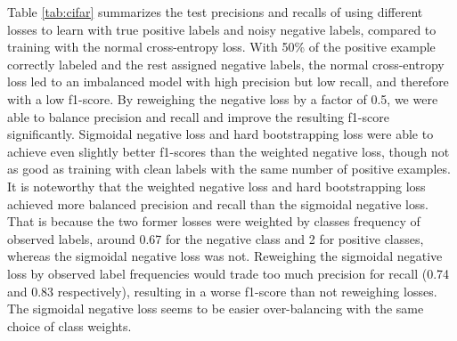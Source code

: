 
Table \ref{tab:cifar} summarizes the test precisions and recalls of using different losses to learn with true positive labels and noisy negative labels, compared to training with the normal cross-entropy loss.
With 50\% of the positive example correctly labeled and the rest assigned negative labels, the normal cross-entropy loss led to an imbalanced model with high precision but low recall, and therefore with a low f1-score.
By reweighing the negative loss by a factor of 0.5, we were able to balance precision and recall and improve the resulting f1-score significantly.
Sigmoidal negative loss and hard bootstrapping loss were able to achieve even slightly better f1-scores than the weighted negative loss, though not as good as training with clean labels with the same number of positive examples.
It is noteworthy that the weighted negative loss and hard bootstrapping loss achieved more balanced precision and recall than the sigmoidal negative loss.
That is because the two former losses were weighted by classes frequency of observed labels, around 0.67 for the negative class and 2 for positive classes, whereas the sigmoidal negative loss was not.
Reweighing the sigmoidal negative loss by observed label frequencies would trade too much precision for recall (0.74 and 0.83 respectively), resulting in a worse f1-score than not reweighing losses.
The sigmoidal negative loss seems to be easier over-balancing with the same choice of class weights.



